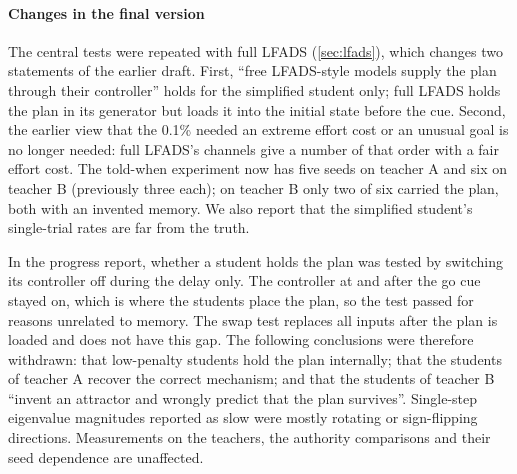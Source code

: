 \documentclass[11pt,a4paper]{article}
\begin{document}
\paragraph{Changes in the final version} The central tests were repeated with full LFADS (\cref{sec:lfads}), which changes two statements of the earlier draft. First, ``free LFADS-style models supply the plan through their controller'' holds for the simplified student only; full LFADS holds the plan in its generator but loads it into the initial state before the cue. Second, the earlier view that the 0.1\% needed an extreme effort cost or an unusual goal is no longer needed: full LFADS's channels give a number of that order with a fair effort cost. The told-when experiment now has five seeds on teacher A and six on teacher B (previously three each); on teacher B only two of six carried the plan, both with an invented memory. We also report that the simplified student's single-trial rates are far from the truth.


In the progress report, whether a student holds the plan was tested by switching its controller off during the delay only. The controller at and after the go cue stayed on, which is where the students place the plan, so the test passed for reasons unrelated to memory. The swap test replaces all inputs after the plan is loaded and does not have this gap. The following conclusions were therefore withdrawn: that low-penalty students hold the plan internally; that the students of teacher A recover the correct mechanism; and that the students of teacher B ``invent an attractor and wrongly predict that the plan survives''. Single-step eigenvalue magnitudes reported as slow were mostly rotating or sign-flipping directions. Measurements on the teachers, the authority comparisons and their seed dependence are unaffected.
\end{document}
